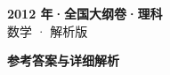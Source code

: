 \documentclass[zihao=-4, a4paper]{ctexart}
\begin{document}
\begin{center}
  {\Large\bfseries 2012 年·全国大纲卷·理科}\\[4pt]
  {\large 数学 · 解析版}
\end{center}
\medskip
{}

\clearpage
{}
\begin{center}{\Large\bfseries 参考答案与详细解析}\end{center}
\medskip

\end{document}
